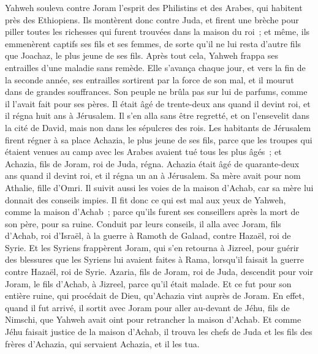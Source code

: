 \begin{multicols}{2}
Yahweh souleva contre Joram l'esprit des Philistins et des Arabes, qui habitent près des Ethiopiens.
Ils montèrent donc contre Juda, et firent une brèche pour piller toutes les richesses qui furent trouvées dans la maison du roi~; et même, ils emmenèrent captifs ses fils et ses femmes, de sorte qu'il ne lui resta d'autre fils que Joachaz, le plus jeune de ses fils.
Après tout cela, Yahweh frappa ses entrailles d'une maladie sans remède.
Elle s'avança chaque jour, et vers la fin de la seconde année, ses entrailles sortirent par la force de son mal, et il mourut dans de grandes souffrances. Son peuple ne brûla pas sur lui de parfums, comme il l'avait fait pour ses pères.
Il était âgé de trente-deux ans quand il devint roi, et il régna huit ans à Jérusalem. Il s'en alla sans être regretté, et on l'ensevelit dans la cité de David, mais non dans les sépulcres des rois.
\VerseOne{}Les habitants de Jérusalem firent régner à sa place Achazia, le plus jeune de ses fils, parce que les troupes qui étaient venues au camp avec les Arabes avaient tué tous les plus âgés~; et Achazia, fils de Joram, roi de Juda, régna.
Achazia était âgé de quarante-deux ans quand il devint roi, et il régna un an à Jérusalem. Sa mère avait pour nom Athalie, fille d'Omri.
Il suivit aussi les voies de la maison d'Achab, car sa mère lui donnait des conseils impies.
Il fit donc ce qui est mal aux yeux de Yahweh, comme la maison d'Achab~; parce qu'ils furent ses conseillers après la mort de son père, pour sa ruine.
Conduit par leurs conseils, il alla avec Joram, fils d'Achab, roi d'Israël, à la guerre à Ramoth de Galaad, contre Hazaël, roi de Syrie. Et les Syriens frappèrent Joram,
qui s'en retourna à Jizreel, pour guérir des blessures que les Syriens lui avaient faites à Rama, lorsqu'il faisait la guerre contre Hazaël, roi de Syrie. Azaria, fils de Joram, roi de Juda, descendit pour voir Joram, le fils d'Achab, à Jizreel, parce qu'il était malade.
Et ce fut pour son entière ruine, qui procédait de Dieu, qu'Achazia vint auprès de Joram. En effet, quand il fut arrivé, il sortit avec Joram pour aller au-devant de Jéhu, fils de Nimschi, que Yahweh avait oint pour retrancher la maison d'Achab.
Et comme Jéhu faisait justice de la maison d'Achab, il trouva les chefs de Juda et les fils des frères d'Achazia, qui servaient Achazia, et il les tua.

\end{multicols}
